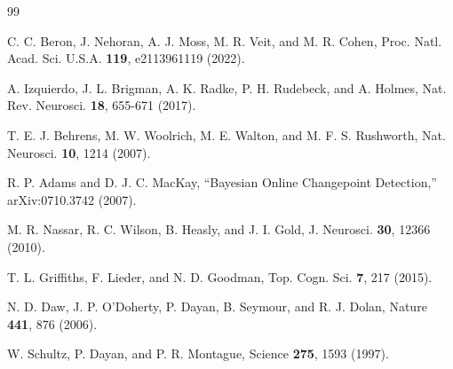 \documentclass[11pt, reprint, aps, prl]{revtex4-2}
\begin{document}
\begin{thebibliography}{99}

C. C. Beron, J. Nehoran, A. J. Moss, M. R. Veit, and M. R. Cohen,
Proc. Natl. Acad. Sci. U.S.A. \textbf{119}, e2113961119 (2022).

A. Izquierdo, J. L. Brigman, A. K. Radke, P. H. Rudebeck, and A. Holmes,
Nat. Rev. Neurosci. \textbf{18}, 655-671 (2017).

T. E. J. Behrens, M. W. Woolrich, M. E. Walton, and M. F. S. Rushworth,
Nat. Neurosci. \textbf{10}, 1214 (2007).

R. P. Adams and D. J. C. MacKay,
``Bayesian Online Changepoint Detection,'' arXiv:0710.3742 (2007).

M. R. Nassar, R. C. Wilson, B. Heasly, and J. I. Gold,
J. Neurosci. \textbf{30}, 12366 (2010).

T. L. Griffiths, F. Lieder, and N. D. Goodman,
Top. Cogn. Sci. \textbf{7}, 217 (2015).

N. D. Daw, J. P. O'Doherty, P. Dayan, B. Seymour, and R. J. Dolan,
Nature \textbf{441}, 876 (2006).

W. Schultz, P. Dayan, and P. R. Montague,
Science \textbf{275}, 1593 (1997).

\end{thebibliography}
\end{document}
